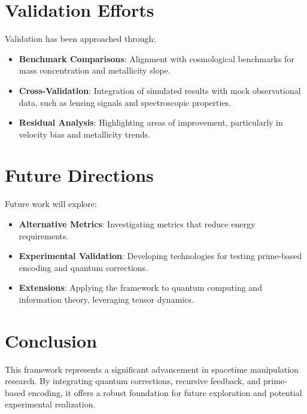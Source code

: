 \documentclass{article}
\theoremstyle{plain}
\begin{document}
\section{Validation Efforts}
Validation has been approached through:
\begin{itemize}
    \item \textbf{Benchmark Comparisons}: Alignment with cosmological benchmarks for mass concentration and metallicity slope.
    \item \textbf{Cross-Validation}: Integration of simulated results with mock observational data, such as lensing signals and spectroscopic properties.
    \item \textbf{Residual Analysis}: Highlighting areas of improvement, particularly in velocity bias and metallicity trends.
\end{itemize}

\section{Future Directions}
Future work will explore:
\begin{itemize}
    \item \textbf{Alternative Metrics}: Investigating metrics that reduce energy requirements.
    \item \textbf{Experimental Validation}: Developing technologies for testing prime-based encoding and quantum corrections.
    \item \textbf{Extensions}: Applying the framework to quantum computing and information theory, leveraging tensor dynamics.
\end{itemize}

\section{Conclusion}
This framework represents a significant advancement in spacetime manipulation research. By integrating quantum corrections, recursive feedback, and prime-based encoding, it offers a robust foundation for future exploration and potential experimental realization.


\nocite{*}


\end{document}
